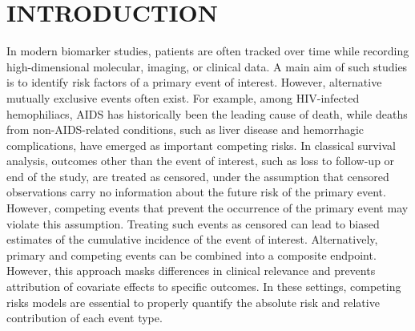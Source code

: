 \documentclass[AMA,Times1COL]{WileyNJDv5} %
\begin{document}

\maketitle

\renewcommand\thefootnote{}

\renewcommand\thefootnote{\fnsymbol{footnote}}
\setcounter{footnote}{1}

\section{INTRODUCTION}\label{sec1}

In modern biomarker studies, patients are often tracked over time while recording high-dimensional molecular, imaging, or clinical data. A main aim of such studies is to identify risk factors of a primary event of interest. However, alternative mutually exclusive events often exist. For example, among HIV-infected hemophiliacs, AIDS has historically been the leading cause of death, while deaths from non-AIDS-related conditions, such as liver disease and hemorrhagic complications, have emerged as important competing risks.\cite{AmoPerez-HoyosMoreno:2006} In classical survival analysis, outcomes other than the event of interest, such as loss to follow-up or end of the study, are treated as censored, under the assumption that censored observations carry no information about the future risk of the primary event. However, competing events that prevent the occurrence of the primary event may violate this assumption. Treating such events as censored can lead to biased estimates of the cumulative incidence of the event of interest. Alternatively, primary and competing events can be combined into a composite endpoint. However, this approach masks differences in clinical relevance and prevents attribution of covariate effects to specific outcomes. In these settings, competing risks models are essential to properly quantify the absolute risk and relative contribution of each event type. 
\end{document}
